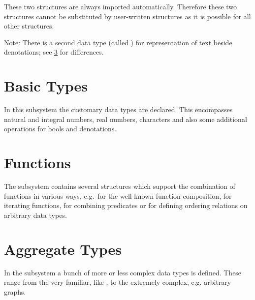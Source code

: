 These two structures are always imported automatically.
Therefore these two structures cannot be substituted by user-written
structures as it is possible for all other structures.

Note: There is a second data type (called ) for
representation of text beside denotations; see \ref{sec:aggrTypes} for
differences. 

\section{Basic Types}
\novice In this subsystem the customary data types are declared. This encompasses
natural and integral numbers, real numbers, characters and also some
additional operations for bools and denotations. 



\section{Functions}
\novice The subsystem  contains several structures which
support the combination of functions in various ways, e.g.~for the
well-known function-composition, for iterating functions, for
combining 
predicates or for defining ordering relations on arbitrary data
types.


\section{Aggregate Types}
\label{sec:aggrTypes}

\novice In the subsystem  a bunch of more or less complex
data types is defined. 
These range from the very familiar, like , to the
extremely complex, e.g. arbitrary graphs.

